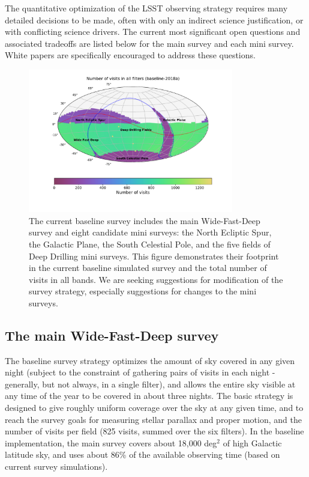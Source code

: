 \documentclass[DM,toc,usenatbib]{lsstdoc}
\begin{document}
The quantitative optimization of the LSST observing strategy requires many 
detailed decisions to be made, often with only an indirect science justification,
or with conflicting science drivers.  The current most significant open questions and associated 
tradeoffs are listed below for the main survey and each mini survey. White papers are specifically 
encouraged to address these questions.

\begin{figure}[htb]
\centering
\includegraphics[width=0.8\textwidth]{Nvisits_all}
\caption{The current baseline survey includes the main Wide-Fast-Deep survey and eight candidate mini surveys:
the North Ecliptic Spur, the Galactic Plane, the South Celestial Pole, and the five fields of Deep Drilling mini surveys.
This figure demonstrates their footprint in the current baseline simulated survey and the total number of visits in all bands.
We are seeking suggestions for modification of the survey strategy, especially suggestions for changes to the
mini surveys.}
\end{figure}

\subsection{The main Wide-Fast-Deep survey} 

The baseline survey strategy optimizes the amount of sky covered in any given night (subject to 
the constraint of gathering pairs of visits in each night - generally, but not always, in a single filter), 
and allows the entire sky visible at any time of the year to be covered in about three nights. 
The basic strategy is designed to give roughly uniform coverage over the sky at any given time, and to reach
the survey goals for measuring stellar parallax and proper motion, and the number of visits per 
field (825 visits, summed over the six filters). In the baseline implementation, the main survey 
covers about 18,000 deg$^2$ of high Galactic latitude sky, and uses about 86\% of the available 
observing time (based on current survey simulations). 
\end{document}
